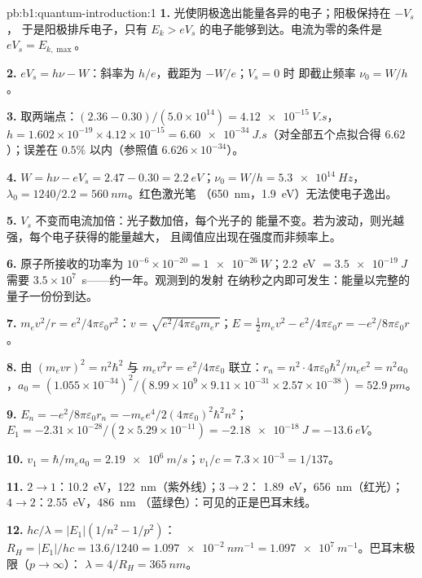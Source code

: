 \begin{solution}{pb:b1:quantum-introduction:1}
\textbf{1.} 光使阴极逸出能量各异的电子；阳极保持在 $-V_s$，
于是阳极排斥电子，只有
$E_k > eV_s$ 的电子能够到达。电流为零的条件是 $eV_s = E_{k,\max}$。

\textbf{2.} $eV_s = h\nu - W$：斜率为 $h/e$，截距为 $-W/e$；$V_s = 0$ 时
即截止频率 $\nu_0 = W/h$。

\textbf{3.} 取两端点：$(2.36 - 0.30)/(5.0 \times 10^{14}) = \qty{4.12e-15}{V.s}$，
$h = 1.602 \times 10^{-19} \times 4.12 \times 10^{-15} = \qty{6.60e-34}{J.s}$（对全部五个点拟合得
$6.62$）；误差在 $0.5\%$ 以内（参照值 $6.626 \times 10^{-34}$）。

\textbf{4.} $W = h\nu - eV_s = 2.47 - 0.30 = \qty{2.2}{eV}$；$\nu_0 = W/h =
\qty{5.3e14}{Hz}$，$\lambda_0 = 1240/2.2 = \qty{560}{nm}$。红色激光笔
（\qty{650}{nm}，\qty{1.9}{eV}）无法使电子逸出。

\textbf{5.} $V_s$ 不变而电流加倍：光子数加倍，每个光子的
能量不变。若为波动，则光越强，每个电子获得的能量越大，
且阈值应出现在强度而非频率上。

\textbf{6.} 原子所接收的功率为 $10^{-6} \times 10^{-20} = \qty{1e-26}{W}$；\qty{2.2}{eV} $=
\qty{3.5e-19}{J}$ 需要 $3.5 \times 10^7$~s——约一年。观测到的发射
在纳秒之内即可发生：能量以完整的量子一份份到达。

\textbf{7.} $m_ev^2/r = e^2/4\pi\varepsilon_0r^2$：$v = \sqrt{e^2/4\pi\varepsilon_0m_er}$；$E =
\tfrac12m_ev^2 - e^2/4\pi\varepsilon_0r = -e^2/8\pi\varepsilon_0r$。

\textbf{8.} 由 $(m_evr)^2 = n^2\hbar^2$ 与 $m_ev^2r = e^2/4\pi\varepsilon_0$ 联立：$r_n = n^2 \cdot
4\pi\varepsilon_0\hbar^2/m_ee^2 = n^2a_0$，$a_0 = (1.055 \times 10^{-34})^2/(8.99 \times 10^9
\times 9.11 \times 10^{-31} \times 2.57 \times 10^{-38}) = \qty{52.9}{pm}$。

\textbf{9.} $E_n = -e^2/8\pi\varepsilon_0r_n = -m_ee^4/2(4\pi\varepsilon_0)^2\hbar^2n^2$；$E_1 =
-2.31 \times 10^{-28}/(2 \times 5.29 \times 10^{-11}) = \qty{-2.18e-18}{J} = \qty{-13.6}{eV}$。

\textbf{10.} $v_1 = \hbar/m_ea_0 = \qty{2.19e6}{m/s}$；$v_1/c = 7.3 \times 10^{-3} =
1/137$。

\textbf{11.} $2 \to 1$：\qty{10.2}{eV}，\qty{122}{nm}（紫外线）；$3 \to 2$：
\qty{1.89}{eV}，\qty{656}{nm}（红光）；$4 \to 2$：\qty{2.55}{eV}，\qty{486}{nm}
（蓝绿色）：可见的正是巴耳末线。

\textbf{12.} $hc/\lambda = |E_1|(1/n^2 - 1/p^2)$：$R_H = |E_1|/hc = 13.6/1240 =
\qty{1.097e-2}{nm^{-1}} = \qty{1.097e7}{m^{-1}}$。巴耳末极限（$p \to \infty$）：
$\lambda = 4/R_H = \qty{365}{nm}$。


\end{solution}
